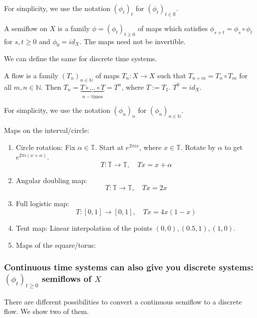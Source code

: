 \documentclass{article}
\newcommand*{\N}{\mathbb{N}}
\newcommand*{\R}{\mathbb{R}}
\newcommand*{\T}{\mathbb{T}}
\begin{document}
For simplicity, we use the notation $(\phi_t)_t$ for $(\phi_t)_{t\in \R}$.

\begin{defin}
    A semiflow on $X$ is a family $\phi=(\phi_t)_{t\geq0}$ of maps which satisfies $\phi_{s+t}=\phi_s\circ\phi_t$ for $s,t\geq 0$ and $\phi_0 = id_X$. The maps need not be invertible.
\end{defin}

We can define the same for discrete time systems.

\begin{defin}
    A flow is a family $(T_n)_{n\in\N}$ of maps $T_n:X\to X$ such that $T_{n+m}=T_n\circ T_m$ for all $m,n\in \N$. Then $T_n = \underbrace{T\circ\dots\circ T}_{n-\text{times}} =T^n$, where $T := T_1$. $T^0 = id_X$.
\end{defin}

For simplicity, we use the notation $(\phi_n)_n$ for $(\phi_n)_{n\in \N}$.

\begin{exam}
    Maps on the interval/circle:
    \begin{enumerate}
        \item Circle rotation: Fix $\alpha\in\T$. Start at $e^{2\pi ix}$, where $x \in \T$. Rotate by $\alpha$ to get $e^{2\pi i (x+\alpha)}$.
        $$T:\T\to\T,\quad Tx = x+\alpha$$

        \item Angular doubling map:
        $$T:\T\to\T, \quad Tx = 2x$$

        \item Full logistic map:
        $$T:[0,1]\to[0,1], \quad Tx = 4x(1-x)$$

        \item Tent map: Linear  interpolation of the points $(0,0),(0.5,1),(1,0)$.

        \item Maps of the square/torus:
    \end{enumerate}
\end{exam}

\subsubsection{Continuous time systems can also give you discrete systems: $(\phi_t)_{t\geq0}$ semiflows of $X$}

There are different possibilities to convert a continuous semiflow to a discrete flow. We show two of them.
\end{document}
